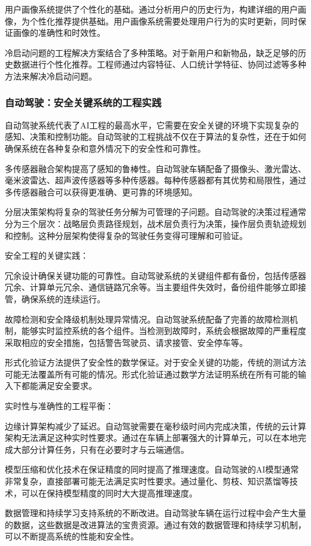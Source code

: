 用户画像系统提供了个性化的基础。通过分析用户的历史行为，构建详细的用户画像，为个性化推荐提供基础。用户画像系统需要处理用户行为的实时更新，同时保证画像的准确性和时效性。

冷启动问题的工程解决方案结合了多种策略。对于新用户和新物品，缺乏足够的历史数据进行个性化推荐。工程师通过内容特征、人口统计学特征、协同过滤等多种方法来解决冷启动问题。

\subsubsection{自动驾驶：安全关键系统的工程实践}

自动驾驶系统代表了AI工程的最高水平，它需要在安全关键的环境下实现复杂的感知、决策和控制功能。自动驾驶的工程挑战不仅在于算法的复杂性，还在于如何确保系统在各种复杂和意外情况下的安全性和可靠性。

多传感器融合架构提高了感知的鲁棒性。自动驾驶车辆配备了摄像头、激光雷达、毫米波雷达、超声波传感器等多种传感器。每种传感器都有其优势和局限性，通过多传感器融合可以获得更准确、更可靠的环境感知。

分层决策架构将复杂的驾驶任务分解为可管理的子问题。自动驾驶的决策过程通常分为三个层次：战略层负责路径规划，战术层负责行为决策，操作层负责轨迹规划和控制。这种分层架构使得复杂的驾驶任务变得可理解和可验证。

安全工程的关键实践：

冗余设计确保关键功能的可靠性。自动驾驶系统的关键组件都有备份，包括传感器冗余、计算单元冗余、通信链路冗余等。当主要组件失效时，备份组件能够立即接管，确保系统的连续运行。

故障检测和安全降级机制处理异常情况。自动驾驶系统配备了完善的故障检测机制，能够实时监控系统的各个组件。当检测到故障时，系统会根据故障的严重程度采取相应的安全措施，包括警告驾驶员、请求接管、安全停车等。

形式化验证方法提供了安全性的数学保证。对于安全关键的功能，传统的测试方法可能无法覆盖所有可能的情况。形式化验证通过数学方法证明系统在所有可能的输入下都能满足安全要求。

实时性与准确性的工程平衡：

边缘计算架构减少了延迟。自动驾驶需要在毫秒级时间内完成决策，传统的云计算架构无法满足这种实时性要求。通过在车辆上部署强大的计算单元，可以在本地完成大部分计算任务，只有在必要时才与云端通信。

模型压缩和优化技术在保证精度的同时提高了推理速度。自动驾驶的AI模型通常非常复杂，直接部署可能无法满足实时性要求。通过量化、剪枝、知识蒸馏等技术，可以在保持模型精度的同时大大提高推理速度。

数据管理和持续学习支持系统的不断改进。自动驾驶车辆在运行过程中会产生大量的数据，这些数据是改进算法的宝贵资源。通过有效的数据管理和持续学习机制，可以不断提高系统的性能和安全性。